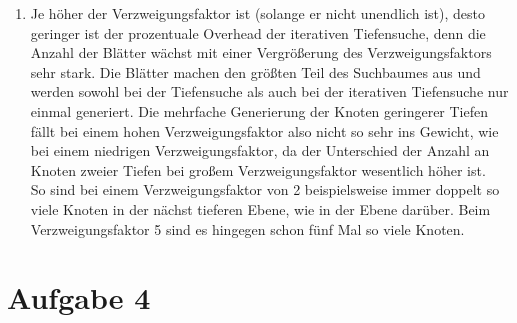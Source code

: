 \documentclass[a4paper,10pt]{article}
\begin{document}
\begin{enumerate}[~~a)]
    \item
    Je höher der Verzweigungsfaktor ist (solange er nicht unendlich ist), desto geringer ist der prozentuale Overhead der iterativen Tiefensuche, denn die Anzahl der Blätter wächst mit einer Vergrößerung des Verzweigungsfaktors sehr stark. Die Blätter machen den größten Teil des Suchbaumes aus und werden sowohl bei der Tiefensuche als auch bei der iterativen Tiefensuche nur einmal generiert. Die mehrfache Generierung der Knoten geringerer Tiefen fällt bei einem hohen Verzweigungsfaktor also nicht so sehr ins Gewicht, wie bei einem niedrigen Verzweigungsfaktor, da der Unterschied der Anzahl an Knoten zweier Tiefen bei großem Verzweigungsfaktor wesentlich höher ist.\\
    So sind bei einem Verzweigungsfaktor von 2 beispielsweise immer doppelt so viele Knoten in der nächst tieferen Ebene, wie in der Ebene darüber. Beim Verzweigungsfaktor 5 sind es hingegen schon fünf Mal so viele Knoten.
\end{enumerate}

\section*{Aufgabe 4}
\end{document}
